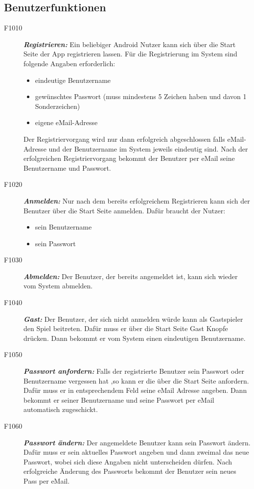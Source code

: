 \documentclass[parskip=full]{scrartcl}
\begin{document}
\subsection{Benutzerfunktionen}
\begin{description}
	\item[F1010] \textbf{\textit{Registrieren: }} Ein beliebiger  \gls{Android} Nutzer kann sich über die Start Seite der App registrieren lassen. Für die Registrierung im System sind folgende Angaben erforderlich: 
	\begin{itemize}
		\item eindeutige Benutzername
		\item gewünschtes Passwort (muss mindestens 5 Zeichen haben und davon 1 Sonderzeichen)
		\item eigene eMail-Adresse
	\end{itemize}
	Der Registriervorgang wird nur dann erfolgreich abgeschlossen falls eMail-Adresse und der Benutzername im System jeweils eindeutig sind. Nach der erfolgreichen Registriervorgang bekommt der Benutzer per eMail seine Benutzername und Passwort.
	\item[F1020] \textbf{\textit{Anmelden: }} Nur nach dem bereits erfolgreichem Registrieren kann sich der Benutzer über die Start Seite anmelden. Dafür braucht der Nutzer:
	\begin{itemize}
		\item sein Benutzername
		\item sein Passwort
	\end{itemize}  
	\item[F1030] \textbf{\textit{Abmelden: }} Der Benutzer, der bereits angemeldet ist, kann sich wieder vom System abmelden.
	\item[F1040] \textbf{\textit{Gast: }} Der Benutzer, der sich nicht anmelden würde kann als Gastspieler den Spiel beitreten. Dafür muss er über die Start Seite Gast Knopfe drücken. Dann bekommt er vom System einen eindeutigen Benutzername. %
	\item[F1050] \textbf{\textit{Passwort anfordern: }} Falls der registrierte Benutzer sein Passwort oder Benutzername vergessen hat ,so kann er die über die Start Seite anfordern. Dafür muss er in entsprechendem Feld seine eMail Adresse angeben. Dann bekommt er seiner Benutzername und seine Passwort per eMail automatisch zugeschickt.
	\item[F1060] \textbf{\textit{Passwort ändern: }}
	Der angemeldete Benutzer kann sein Passwort ändern. Dafür muss er sein aktuelles Passwort angeben und dann zweimal das neue Passwort, wobei sich diese Angaben nicht unterscheiden dürfen. Nach erfolgreiche Änderung des Passworts bekommt der Benutzer sein neues Pass per eMail.
	
	
\end{description}
\end{document}
